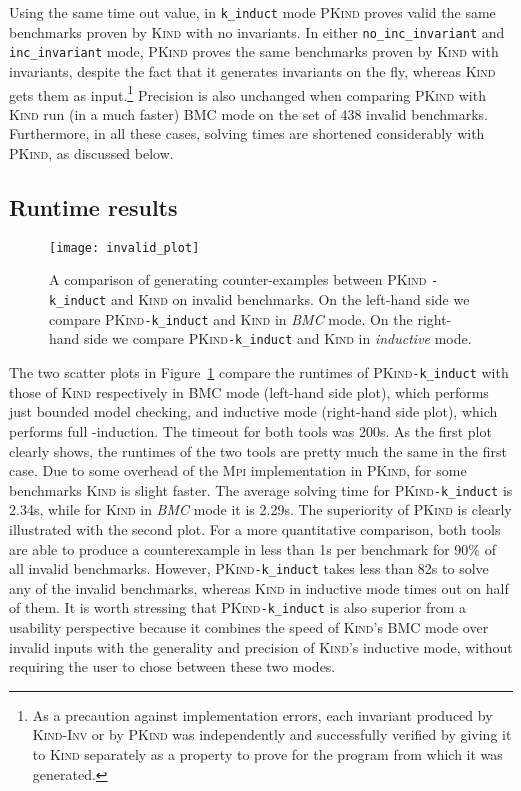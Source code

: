 \documentclass[submission,copyright,creativecommons]{eptcs}
\newcommand{\Kind}{\textrm{\textsc{Kind}}\xspace}
\newcommand{\KindInv}{\textrm{\textsc{Kind}-\textsc{Inv}}\xspace}
\newcommand{\PKind}{\textrm{\textsc{PKind}}\xspace}
\newcommand{\Mpi}{\textrm{\textsc{Mpi}}\xspace}
\begin{document}
Using the same time out value, in \texttt{\small k\_induct} mode \PKind
proves valid the same benchmarks proven by \Kind with no invariants.
In either \texttt{\small no\_inc\_invariant} and \texttt{\small inc\_invariant}
mode, \PKind proves the same benchmarks proven by \Kind with
invariants, despite the fact that it generates invariants on the fly,
whereas \Kind gets them as input.\footnote{ As a precaution against
  implementation errors, each invariant produced by \KindInv or by
  \PKind was independently and successfully verified by giving it to
  \Kind separately as a property to prove for the program from which
  it was generated.  
  }
Precision is also unchanged when comparing \PKind with \Kind run 
(in a much faster) BMC mode on the set of 438 invalid benchmarks.  
Furthermore, in all these cases, solving times are shortened considerably with
\PKind, as discussed below.


\vspace{-0.5cm}

\subsection{Runtime results}

\begin{figure}[t]
\centering
\texttt{[image: invalid\_plot]} 
\caption{ A comparison of generating counter-examples between \PKind
  \texttt{\small -k\_induct} and \Kind on invalid benchmarks. On the 
  left-hand side we compare \PKind \texttt{\small -k\_induct} and \Kind in
  \textit{BMC} mode. On the right-hand side we
  compare \PKind \texttt{\small -k\_induct} and \Kind in
  \textit{inductive} mode.  }
\label{fig:invalid}
\end{figure}

The two scatter plots in Figure~\ref{fig:invalid} compare
the runtimes of \PKind \texttt{\small -k\_induct} with those of \Kind
respectively in BMC mode (left-hand side plot),
which performs just bounded model checking,
and inductive mode (right-hand side plot),
which performs full -induction.
The timeout for both tools was 200s. 
As the first plot clearly shows,
the runtimes of the two tools are pretty much the same in the first case. 
Due to some overhead of the \Mpi implementation in \PKind, 
for some benchmarks \Kind is slight faster. 
The average solving time for \PKind \texttt{\small -k\_induct} is 2.34s,
while for \Kind in \textit{BMC} mode it is 2.29s.
The superiority of \PKind is clearly illustrated with the second plot.
For a more quantitative comparison, 
both tools are able to produce a counterexample in less than 1s
per benchmark for 90\% of all invalid benchmarks.
However, \PKind \texttt{\small -k\_induct} takes less than 82s to solve
any of the invalid benchmarks,
whereas \Kind in inductive mode 
times out on half of them.
It is worth stressing that \PKind \texttt{\small -k\_induct} 
is also superior from a usability perspective 
because it combines the speed of \Kind's BMC mode over invalid inputs
with the generality and precision of \Kind's inductive mode,
without requiring the user to chose between these two modes.
\end{document}
